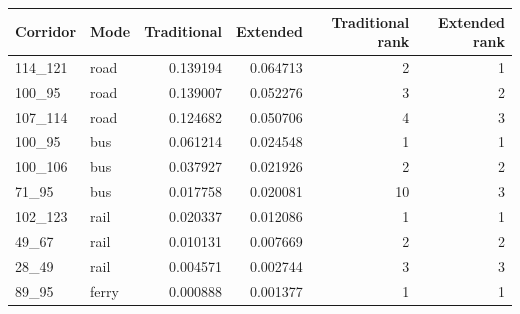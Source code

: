 \begin{tabular}{llrrrr}
\toprule
Corridor & Mode & Traditional & Extended & Traditional rank & Extended rank \\
\midrule
114\_121 & road & 0.139194 & 0.064713 & 2 & 1 \\
100\_95 & road & 0.139007 & 0.052276 & 3 & 2 \\
107\_114 & road & 0.124682 & 0.050706 & 4 & 3 \\
100\_95 & bus & 0.061214 & 0.024548 & 1 & 1 \\
100\_106 & bus & 0.037927 & 0.021926 & 2 & 2 \\
71\_95 & bus & 0.017758 & 0.020081 & 10 & 3 \\
102\_123 & rail & 0.020337 & 0.012086 & 1 & 1 \\
49\_67 & rail & 0.010131 & 0.007669 & 2 & 2 \\
28\_49 & rail & 0.004571 & 0.002744 & 3 & 3 \\
89\_95 & ferry & 0.000888 & 0.001377 & 1 & 1 \\
\bottomrule
\end{tabular}
